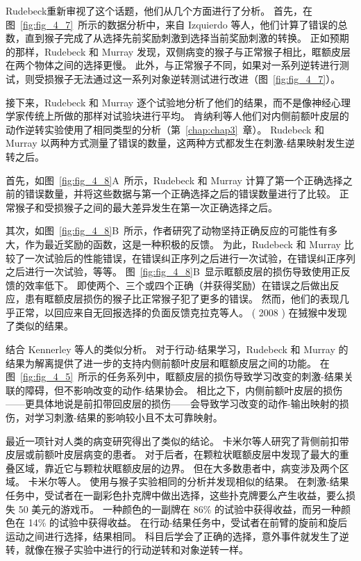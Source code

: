 Rudebeck\cite{rudebeck2008frontal}重新审视了这个话题，他们从几个方面进行了分析。
首先，在图~\ref{fig:fig_4_7}~所示的数据分析中，来自 Izquierdo 等人\cite{izquierdo2004bilateral}，他们计算了错误的总数，直到猴子完成了从选择先前奖励刺激到选择当前奖励刺激的转换。
正如预期的那样，Rudebeck 和 Murray 发现，双侧病变的猴子与正常猴子相比，眶额皮层在两个物体之间的选择更慢。
此外，与正常猴子不同，如果对一系列逆转进行测试，则受损猴子无法通过这一系列对象逆转测试进行改进（图~\ref{fig:fig_4_7}）。\par


接下来，Rudebeck 和 Murray 逐个试验地分析了他们的结果，而不是像神经心理学家传统上所做的那样对试验块进行平均。
肯纳利等人\cite{kennerley2006optimal}他们对内侧前额叶皮层的动作逆转实验使用了相同类型的分析（第~\ref{chap:chap3}~章）。
Rudebeck 和 Murray 以两种方式测量了错误的数量，这两种方式都发生在刺激-结果映射发生逆转之后。\par


首先，如图~\ref{fig:fig_4_8}A~所示，Rudebeck 和 Murray 计算了第一个正确选择之前的错误数量，并将这些数据与第一个正确选择之后的错误数量进行了比较。
正常猴子和受损猴子之间的最大差异发生在第一次正确选择之后。\par


其次，如图~\ref{fig:fig_4_8}B~所示，作者研究了动物坚持正确反应的可能性有多大，作为最近奖励的函数，这是一种积极的反馈。
为此，Rudebeck 和 Murray 比较了一次试验后的性能错误，在错误纠正序列之后进行一次试验，在错误纠正序列之后进行一次试验，等等。
图~\ref{fig:fig_4_8}B~显示眶额皮层的损伤导致使用正反馈的效率低下。
即使两个、三个或四个正确（并获得奖励）在错误之后做出反应，患有眶额皮层损伤的猴子比正常猴子犯了更多的错误。
然而，他们的表现几乎正常，以回应来自无回报选择的负面反馈\cite{rudebeck2008frontal}克拉克等人。
( 2008 ) 在狨猴中发现了类似的结果。\par


结合 Kennerley 等人的类似分析\cite{kennerley2006optimal}。
对于行动-结果学习，Rudebeck 和 Murray 的结果为解离提供了进一步的支持内侧前额叶皮层和眶额皮层之间的功能。
在图~\ref{fig:fig_4_5}~所示的任务系列中，眶额皮层的损伤导致学习改变的刺激-结果关联的障碍，但不影响改变的动作-结果协会。
相比之下，内侧前额叶皮层的损伤——更具体地说是前扣带回皮层的损伤——会导致学习改变的动作-输出映射的损伤，对学习刺激-结果的影响较小且不太可靠映射。\par


最近一项针对人类的病变研究得出了类似的结论。
卡米尔等人\cite{camille2011double}研究了背侧前扣带皮层或前额叶皮层病变的患者。
对于后者，在颗粒状眶额皮层中发现了最大的重叠区域，靠近它与颗粒状眶额皮层的边界。
但在大多数患者中，病变涉及两个区域。
卡米尔等人。 使用与猴子实验相同的分析并发现相似的结果。
在刺激-结果任务中，受试者在一副彩色扑克牌中做出选择，这些扑克牌要么产生收益，要么损失 50 美元的游戏币。
一种颜色的一副牌在 86\% 的试验中获得收益，而另一种颜色在 14\% 的试验中获得收益。
在行动-结果任务中，受试者在前臂的旋前和旋后运动之间进行选择，结果相同。
科目后学会了正确的选择，意外事件就发生了逆转，就像在猴子实验中进行的行动逆转和对象逆转一样。\par


